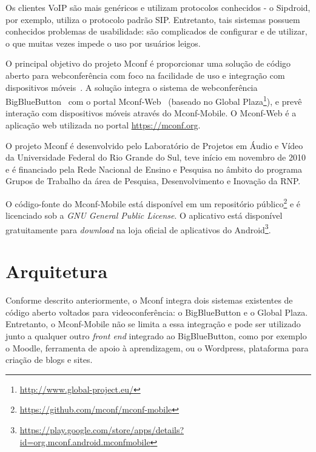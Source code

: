 \documentclass{acm_proc_article-sp}
\begin{document}
Os clientes VoIP são mais genéricos e utilizam protocolos conhecidos - o Sipdroid, por exemplo, utiliza o protocolo padrão SIP. Entretanto, tais sistemas possuem conhecidos problemas de usabilidade: são complicados de configurar e de utilizar, o que muitas vezes impede o uso por usuários leigos.

O principal objetivo do projeto Mconf é proporcionar uma solução de código aberto para webconferência com foco na facilidade de uso e integração com dispositivos móveis~\cite{mconf-book}. A solução integra o sistema de webconferência BigBlueButton~\cite{bigbluebutton} com o portal Mconf-Web~\cite{mconf-web} (baseado no Global Plaza\footnote{\url{http://www.global-project.eu/}}), e prevê interação com dispositivos móveis através do Mconf-Mobile. O Mconf-Web é a aplicação web utilizada no portal \url{https://mconf.org}.

O projeto Mconf é desenvolvido pelo Laboratório de Projetos em Áudio e Vídeo da Universidade Federal do Rio Grande do Sul, teve início em novembro de 2010 e é financiado pela Rede Nacional de Ensino e Pesquisa no âmbito do programa Grupos de Trabalho da área de Pesquisa, Desenvolvimento e Inovação da RNP.

O código-fonte do Mconf-Mobile está disponível em um repositório público\footnote{\url{https://github.com/mconf/mconf-mobile}} e é licenciado sob a \emph{GNU General Public License}. O aplicativo está disponível gratuitamente para \emph{download} na loja oficial de aplicativos do Android\footnote{\url{https://play.google.com/store/apps/details?id=org.mconf.android.mconfmobile}}.


\section{Arquitetura}\label{sec:arquitetura}

Conforme descrito anteriormente, o Mconf integra dois sistemas existentes de código aberto voltados para videoconferência: o BigBlueButton e o Global Plaza. Entretanto, o Mconf-Mobile não se limita a essa integração e pode ser utilizado junto a qualquer outro \emph{front end} integrado ao BigBlueButton, como por exemplo o Moodle, ferramenta de apoio à aprendizagem, ou o Wordpress, plataforma para criação de blogs e sites.
\end{document}

